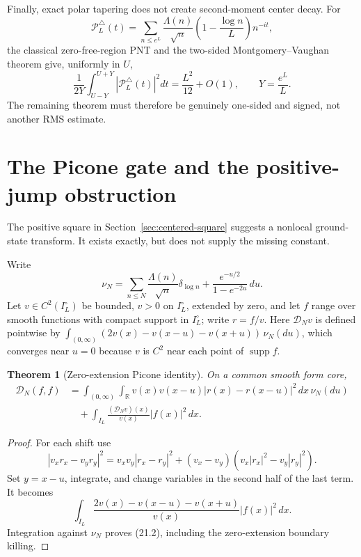 \documentclass[11pt]{amsart}
\newtheorem{theorem}{Theorem}[section]
\theoremstyle{definition}
\theoremstyle{remark}
\begin{document}
Finally, exact polar tapering does not create second-moment center decay.
For
\[
 \mathcal P_L^\triangle(t)
 =
 \sum_{n\le e^L}\frac{\Lambda(n)}{\sqrt n}
 \left(1-\frac{\log n}{L}\right)n^{-it},
\]
the classical zero-free-region PNT and the two-sided
Montgomery--Vaughan theorem give, uniformly in \(U\),
\[
 \frac1{2Y}\int_{U-Y}^{U+Y}
 |\mathcal P_L^\triangle(t)|^2dt
 =
 \frac{L^2}{12}+O(1),
 \qquad Y=\frac{e^L}{L}.
\tag{20.14}
\]
The remaining theorem must therefore be genuinely one-sided and signed,
not another RMS estimate.

\section{The Picone gate and the positive-jump obstruction}
\label{sec:picone}

The positive square in Section~\ref{sec:centered-square} suggests a
nonlocal ground-state transform.  It exists exactly, but does not supply
the missing constant.

Write
\[
 \nu_N
 =
 \sum_{n\le N}\frac{\Lambda(n)}{\sqrt n}\delta_{\log n}
 +\frac{e^{-u/2}}{1-e^{-2u}}\,du.
\tag{21.1}
\]
Let \(v\in C^2(I_L^\circ)\) be bounded, \(v>0\) on \(I_L^\circ\), extended by zero,
and let \(f\) range over smooth functions with compact support in
\(I_L^\circ\); write \(r=f/v\).  Here \(\mathcal D_Nv\) is defined
pointwise by
\(\int_{(0,\infty)}(2v(x)-v(x-u)-v(x+u))\,\nu_N(du)\), which converges
near \(u=0\) because \(v\) is \(C^2\) near each point of
\(\operatorname{supp}f\).

\begin{theorem}[Zero-extension Picone identity]
\label{thm:picone}
On a common smooth form core,
\[
\boxed{
\begin{aligned}
 \mathcal D_N(f,f)
 &=
 \int_{(0,\infty)}\!\int_{\mathbb R}
 v(x)v(x-u)|r(x)-r(x-u)|^2\,dx\,\nu_N(du)\\
 &\quad+
 \int_{I_L}\frac{(\mathcal D_Nv)(x)}{v(x)}
 |f(x)|^2\,dx.
\end{aligned}}
\tag{21.2}
\]
\end{theorem}

\begin{proof}
For each shift use
\[
 |v_xr_x-v_yr_y|^2
 =
 v_xv_y|r_x-r_y|^2
 +(v_x-v_y)(v_x|r_x|^2-v_y|r_y|^2).
\]
Set \(y=x-u\), integrate, and change variables in the second half of the
last term.  It becomes
\[
 \int_{I_L}
 \frac{2v(x)-v(x-u)-v(x+u)}{v(x)}|f(x)|^2\,dx.
\]
Integration against \(\nu_N\) proves (21.2), including the zero-extension
boundary killing.
\end{proof}
\end{document}
